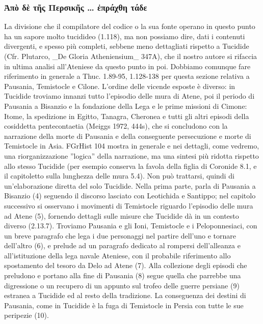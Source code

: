         \subsubsection{\textgreek{Ἀπὸ δὲ τῆς Περσικῆς … ἐπράχθη τάδε}}
        La divisione che il compilatore del codice o la sua fonte operano in questo punto ha un sapore molto tucidideo (1.118), ma non possiamo dire, dati i contenuti divergenti, e spesso più completi, sebbene meno dettagliati rispetto a Tucidide (Cfr. Plutarco, _De Gloria Atheniensium_ 347A), che il nostro autore si rifaccia in ultima analisi all'Ateniese da questo punto in poi. Dobbiamo comunque fare riferimento in generale a Thuc. 1.89-95, 1.128-138 per questa sezione relativa a Pausania, Temistocle e Cilone. L'ordine delle vicende esposte è diverso: in Tucidide troviamo innanzi tutto l'episodio delle mura di Atene, poi il periodo di Pausania  a Bisanzio e la fondazione della Lega e le prime missioni di Cimone: Itome, la spedizione in Egitto, Tanagra, Cheronea e tutti gli altri episodi della cosiddetta pentecontaetia (Meiggs 1972, 444s), che si concludono con la narrazione della morte di Pausania  e della conseguente persecuzione e morte di Temistocle in Asia. FGrHist 104 mostra in generale e nei dettagli, come vedremo, una riorganizzazione ''logica'' della narrazione, ma una sintesi più ridotta rispetto allo stesso Tucidide (per esempio conserva la favola della figlia di Coronide 8.1, e il capitoletto sulla lunghezza delle mura 5.4). Non può trattarsi, quindi di un'elaborazione diretta del solo Tucidide. Nella prima parte, parla di Pausania  a Bisanzio (4) seguendo il discorso lasciato con Leotichida e Santippo; nel capitolo successivo si osservano i movimenti di Temistocle riguardo l'episodio delle mura ad Atene (5), fornendo dettagli sulle misure che Tucidide dà in un contesto diverso (2.13.7). Troviamo Pausania  e gli Ioni, Temistocle e i Peloponnesiaci, con un breve paragrafo che lega i due personaggi nel partire dell'uno e tornare dell'altro (6), e prelude ad un paragrafo dedicato al rompersi dell'alleanza e all'istituzione della lega navale Ateniese, con il probabile riferimento allo spostamento del tesoro da Delo ad Atene (7). Alla collezione degli episodi che preludono e portano alla fine di Pausania  (8) segue quella che parrebbe una digressione o un recupero di un appunto sul trofeo delle guerre persiane (9) estranea a Tucidide ed al resto della tradizione. La conseguenza dei destini di Pausania, come in Tucidide è la fuga di Temistocle in Persia con tutte le sue peripezie (10). 
